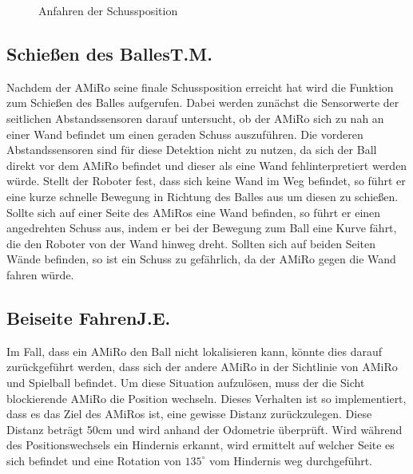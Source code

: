 \begin{figure} []
	\caption{Anfahren der Schussposition} 
	\label{fig:anfahren}
\end{figure} 


\subsection[Schießen des Balles]{Schießen des Balles\hfill {\normalsize T.M.}} %

Nachdem der AMiRo seine finale Schussposition erreicht hat wird die Funktion zum Schießen des Balles aufgerufen. Dabei werden zunächst die Sensorwerte der seitlichen Abstandssensoren darauf untersucht, ob der AMiRo sich zu nah an einer Wand befindet um einen geraden Schuss auszuführen. Die vorderen Abstandssensoren sind für diese Detektion nicht zu nutzen, da sich der Ball direkt vor dem AMiRo befindet und dieser als eine Wand fehlinterpretiert werden würde. 
Stellt der Roboter fest, dass sich keine Wand im Weg befindet, so führt er eine kurze schnelle Bewegung in Richtung des Balles aus um diesen zu schießen.
Sollte sich auf einer Seite des AMiRos eine Wand befinden, so führt er einen angedrehten Schuss aus, indem er bei der Bewegung zum Ball eine Kurve fährt, die den Roboter von der Wand hinweg dreht. 
Sollten sich auf beiden Seiten Wände befinden, so ist ein Schuss zu gefährlich, da der AMiRo gegen die Wand fahren würde.


\subsection[Beiseite Fahren]{Beiseite Fahren\hfill {\normalsize J.E.}} %
Im Fall, dass ein AMiRo den Ball nicht lokalisieren kann, könnte dies darauf zurückgeführt werden, dass sich der andere AMiRo in der Sichtlinie von AMiRo und Spielball befindet. Um diese Situation aufzulösen, muss der die Sicht blockierende AMiRo die Position wechseln.
Dieses Verhalten ist so implementiert, dass es das Ziel des AMiRos ist, eine gewisse Distanz zurückzulegen. Diese Distanz beträgt 50cm und wird anhand der Odometrie überprüft.
Wird während des Positionswechsels ein Hindernis erkannt, wird ermittelt auf welcher Seite es sich befindet und eine Rotation von $135^\circ$ vom Hindernis weg durchgeführt.

